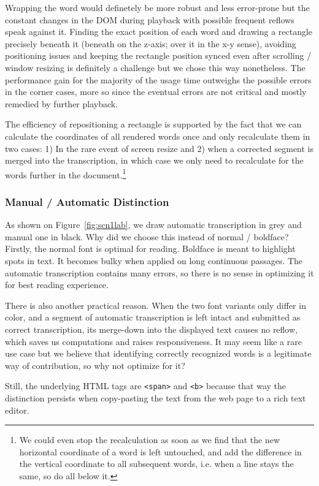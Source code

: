 \documentclass{svproc}
\begin{document}
Wrapping the word would definetely be more robust and less error-prone but the
constant changes in the DOM during playback with possible frequent reflows speak
against it. Finding the exact position of each word and drawing a rectangle
precisely beneath it (beneath on the z-axis; over it in the x-y sense), avoiding
positioning issues and keeping the rectangle position synced even after scrolling
/ window resizing is definitely a challenge but we chose this way nonetheless.
The performance gain for the majority of the usage time outweighs the possible
errors in the corner cases, more so since the eventual errors are not critical
and mostly remedied by further playback.

The efficiency of repositioning a rectangle is supported by the fact that we can
calculate the coordinates of all rendered words once and only recalculate them
in two cases: 1) In the rare event of screen resize and 2) when a corrected
segment is merged into the transcription, in which case we only need to
recalculate for the words further in the document.\footnote{We could even stop
the recalculation as soon as we find that the new horizontal coordinate of a
word is left untouched, and add the difference in the vertical coordinate to all
subsequent words, i.e. when a line stays the same, so do all below it.}

\subsubsection{Manual / Automatic Distinction}

As shown on Figure~\ref{fig:scn1lab}, we draw automatic transcription in grey
and manual one in black. Why did we choose this instead of normal / boldface?
Firstly, the normal font is optimal for reading. Boldface is meant to highlight
spots in text. It becomes bulky when applied on long continuous passages. The
automatic transcription contains many errors, so there is no sense in optimizing
it for best reading experience.

There is also another practical reason. When the two font variants only differ
in color, and a segment of automatic transcription is left intact and submitted
as correct transcription, its merge-down into the displayed text causes no
reflow, which saves us computations and raises responsiveness. It may seem like
a rare use case but we believe that identifying correctly recognized words is a
legitimate way of contribution, so why not optimize for it?

Still, the underlying HTML tags are \texttt{<span>} and \texttt{<b>} because
that way the distinction persists when copy-pasting the text from the web page
to a rich text editor.
\end{document}
